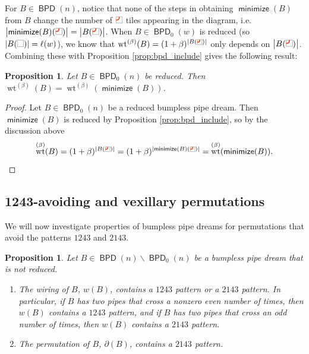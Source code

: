 \documentclass[11pt]{article}
\newtheorem{proposition}[theo]{Proposition}
\theoremstyle{definition}
\numberwithin{equation}{section}
\newcommand{\sm}{\smallsetminus}
\DeclarePairedDelimiter\abs{\lvert}{\rvert}
\DeclareMathOperator{\wt}{wt}
\DeclareMathOperator{\minimize}{\mathsf{minimize}}
\DeclareMathOperator{\BPD}{\mathsf{BPD}}
\newcommand{\pipecolor}{UForange}
\newcommand{\tilescale}{0.27}
\newcommand{\smalltilescale}{0.2}
\newcommand{\drawSquare}{
    \draw[
        xshift=0.5cm,yshift=0.5cm,
        black,opacity=0.5,thin
    ] (0,0) rectangle (1,1);
}
\newcommand{\drawJelbow}[2]{
    \draw[color=\pipecolor,very thick]
    (#1,#2+0.5) to (#1,#2+0.25) to[bend left] (#1-0.25,#2) to (#1-0.5,#2);
}
\newcommand{\blank}[1][scale=\tilescale,baseline=4pt]{
    \begin{tikzpicture}[#1]
    \drawSquare
    \end{tikzpicture}
}
\newcommand{\jelbow}[1][scale=\tilescale,baseline=4pt]{
    \begin{tikzpicture}[#1]
    \drawSquare
    \drawJelbow11
    \end{tikzpicture}
}
\newcommand{\smalljelbow}{\jelbow[scale=\smalltilescale,baseline=4pt]}
\begin{document}
For $B\in \BPD(n)$, notice that none of the steps in obtaining $\minimize(B)$ from $B$ change the number of $\jelbow$ tiles appearing in the diagram, i.e.
$\abs*{\minimize(B)(\jelbow)} = \abs*{B(\jelbow)}$.
When $B\in \BPD_0(w)$ is reduced (so $\abs*{B(\blank)} = \ell(w)$), we know that $\wt^{(\beta)}(B) = (1+\beta)^{\abs*{B(\smalljelbow)}}$ only depends on $\abs*{B(\jelbow)}$.
Combining these with Proposition \ref{prop:bpd_include} gives the following result:

\begin{proposition}
\label{prop:bpd_weight}
    Let $B\in \BPD_0(n)$ be reduced.
    Then $\wt^{(\beta)}(B) = \wt^{(\beta)}(\minimize(B))$.
\end{proposition}

\begin{proof}
    Let $B\in \BPD_0(n)$ be a reduced bumpless pipe dream.
    Then $\minimize(B)$ is reduced by Proposition \ref{prop:bpd_include}, so by the discussion above \[
        \wt^{(\beta)}(B) =
        (1+\beta)^{\abs*{B(\smalljelbow)}} =
        (1+\beta)^{\abs*{\minimize(B)(\smalljelbow)}} =
        \wt^{(\beta)}(\minimize(B)). \qedhere
    \]
\end{proof}



\subsection{1243-avoiding and vexillary permutations}
\label{sect:1243_2143}

We will now investigate properties of bumpless pipe dreams for permutations that avoid the patterns $1243$ and $2143$.

\begin{proposition}
\label{prop:BPD_nonred_1243_2143}
    Let $B\in \BPD(n) \sm \BPD_0(n)$ be a bumpless pipe dream that is not reduced.
    \begin{enumerate}
        \item[(a)] The wiring of $B$, $w(B)$, contains a $1243$ pattern or a $2143$ pattern.
        In particular, if $B$ has two pipes that cross a nonzero even number of times, then $w(B)$ contains a $1243$ pattern, and if $B$ has two pipes that cross an odd number of times, then $w(B)$ contains a $2143$ pattern.
        \item[(b)] The permutation of $B$, $\partial(B)$, contains a $2143$ pattern.
    \end{enumerate}
\end{proposition}
\end{document}
